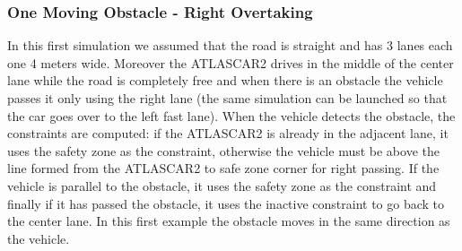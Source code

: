 \documentclass[conference, 11pt]{IEEEtran}
\begin{document}
\subsubsection{One Moving Obstacle - Right Overtaking}
In this first simulation we assumed that the road is straight and has 3 lanes each one 4 meters wide. Moreover the ATLASCAR2 drives in the middle of the center lane while the road is completely free and when there is an obstacle the vehicle passes it only using the right lane (the same simulation can be launched so that the car goes over to the left fast lane). When the vehicle detects the obstacle, the constraints are computed: if the ATLASCAR2 is already in the adjacent lane, it uses the safety zone as the constraint, otherwise the vehicle must be above the line formed from the ATLASCAR2 to safe zone corner for right passing. If the vehicle is parallel to the obstacle, it  uses the safety zone as the constraint and finally if it has passed the obstacle, it uses the inactive constraint to go back to the center lane. In this first example the obstacle moves in the same direction as the vehicle.
\end{document}
